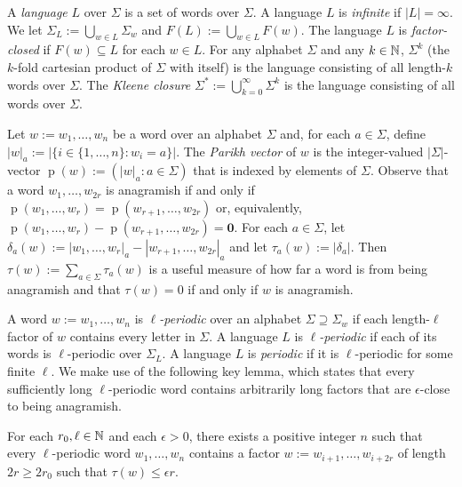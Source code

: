 \documentclass{patmorin}
\DeclareMathOperator{\hist}{p}
\begin{document}
A \emph{language} $L$ over $\Sigma$ is a set of words over $\Sigma$.  A language $L$ is \emph{infinite} if $|L|=\infty$.  We let $\Sigma_L:=\bigcup_{w\in L}\Sigma_w$ and $F(L):=\bigcup_{w\in L}F(w)$.  The language $L$ is \emph{factor-closed} if $F(w)\subseteq L$ for each $w\in L$.  For any alphabet $\Sigma$ and any $k\in\mathbb{N}$, $\Sigma^k$ (the $k$-fold cartesian product of $\Sigma$ with itself) is the language consisting of all length-$k$ words over $\Sigma$.  The \emph{Kleene closure} $\Sigma^*:=\bigcup_{k=0}^\infty \Sigma^k$ is the language consisting of all words over $\Sigma$.


Let $w:=w_1,\ldots,w_n$ be a word over an alphabet $\Sigma$ and, for each $a\in \Sigma$, define $|w|_a:=|\{i\in\{1,\ldots,n\}:w_i=a\}|$.  The \emph{Parikh vector} of $w$ is the integer-valued $|\Sigma|$-vector $\hist(w):=(|w|_{a}:a\in\Sigma)$ that is indexed by elements of $\Sigma$.  Observe that a word $w_1,\ldots,w_{2r}$ is anagramish if and only if $\hist(w_1,\ldots,w_r)=\hist(w_{r+1},\ldots,w_{2r})$ or, equivalently, $\hist(w_1,\ldots,w_r)-\hist(w_{r+1},\ldots,w_{2r})=\boldsymbol{0}$.
For each $a\in\Sigma$, let $\delta_a(w):=|w_1,\ldots,w_r|_{a}-|w_{r+1},\ldots,w_{2r}|_{a}$ and let $\tau_a(w):=|\delta_a|$.
Then $\tau(w):=\sum_{a\in\Sigma}\tau_a(w)$ is a useful measure of how far a word is from being anagramish and that $\tau(w)=0$ if and only if $w$ is anagramish.

A word $w:=w_1,\ldots,w_n$ is \emph{$\ell$-periodic} over an alphabet $\Sigma\supseteq\Sigma_w$ if each length-$\ell$ factor of $w$ contains every letter in $\Sigma$.  A language $L$ is \emph{$\ell$-periodic}  if each of its words is $\ell$-periodic over $\Sigma_L$.  A language $L$ is \emph{periodic} if it is $\ell$-periodic for some finite $\ell$.  We make use of the following key lemma, which states that every sufficiently long $\ell$-periodic word contains arbitrarily long factors that are $\epsilon$-close to being anagramish.

\begin{lem}\label{near_anagram_fourier}
    For each $r_0,\ell\in\mathbb{N}$ and each $\epsilon>0$, there exists a positive integer $n$ such that every $\ell$-periodic word $w_1,\ldots,w_n$ contains a factor $w:=w_{i+1},\ldots,w_{i+2r}$ of length $2r \ge 2r_0$ such that $\tau(w)\le \epsilon r$.
\end{lem}
\end{document}
